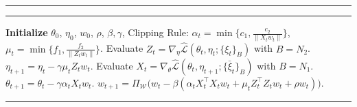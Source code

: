 \documentclass[twoside]{article} %
\theoremstyle{plain}
\theoremstyle{definition}
\theoremstyle{remark}
\newcommand{\fhL}{\hat{\mathcal{L}}}
\begin{document}

\begin{algorithm}[t]
\hrule
\vspace{0.3em}

\caption{Double-Clip MGDA for DR-MOO}
\label{alg1-3}

\vspace{-0.5em}
\hrule
\vspace{0.3em}

\footnotesize
\begin{algorithmic}[1]
\STATE \textbf{Initialize} $\theta_0$, $\eta_0$, $w_0$, $\rho$, $\beta,\gamma$,
\STATE Clipping Rule:
$\alpha_t=\min\!\{c_1,\frac{c_2}{\|X_t w_t\|}\}$,
$\mu_t=\min\!\{f_1,\frac{f_2}{\|Z_t w_t\|}\}$.
    \STATE Evaluate
    $Z_t=\nabla_{\eta}\fhL(\theta_t,\eta_t;\{\xi_t\}_B)$ with $B=N_2$.
    \STATE $\eta_{t+1}=\eta_t-\gamma\mu_t Z_t w_t$.
    \STATE Evaluate
    $X_t=\nabla_{\theta}\fhL(\theta_t,\eta_{t+1};\{\bar{\xi}_t\}_B)$ with $B=N_1$.
    \STATE $\theta_{t+1}=\theta_t-\gamma\alpha_t X_t w_t$.
    \STATE $w_{t+1}=
    \Pi_{\mathcal{W}}\big(w_t-\beta(
    \alpha_t X_t^\top X_t w_t
    +\mu_t Z_t^\top Z_t w_t
    +\rho w_t
    )\big)$.
\ENDFOR
\end{algorithmic}

\vspace{0.3em}
\hrule
\end{algorithm}
\end{document}
